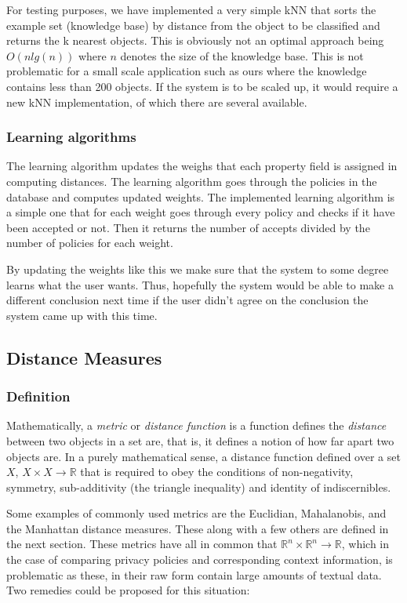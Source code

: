 For testing purposes, we have implemented a very simple kNN that sorts the example set (knowledge base) by distance from the object to be classified and returns the k nearest objects. This is obviously not an optimal approach being $O(n lg(n))$ where $n$ denotes the size of the knowledge base. This is not problematic for a small scale application such as ours where the knowledge contains less than 200 objects. If the system is to be scaled up, it would require a new kNN implementation, of which there are several available.

\subsubsection{Learning algorithms}
The learning algorithm updates the weighs that each property field is assigned in computing distances. The learning algorithm goes through the policies in the database and computes updated weights. The implemented learning algorithm is a simple one that for each weight goes through every policy and checks if it have been accepted or not. Then it returns the number of accepts divided by the number of policies for each weight.

By updating the weights like this we make sure that the system to some degree learns what the user wants. Thus, hopefully the system would be able to make a different conclusion next time if the user didn't agree on the conclusion the system came up with this time.

\subsection{Distance Measures}\label{SimilarityMeasures}

\subsubsection{Definition}

Mathematically, a \emph{metric} or \emph{distance function} is a function defines the \emph{distance} between two objects in a set are, that is, it defines a notion of how far apart two objects are. In a purely mathematical sense, a distance function defined over a set $X$, $X\times X\longrightarrow \mathbb{R}$ that is required to obey the conditions of non-negativity, symmetry, sub-additivity (the triangle inequality) and identity of indiscernibles. 

Some examples of commonly used metrics are the Euclidian, Mahalanobis, and the Manhattan distance measures. These along with a few others are defined in the next section. These metrics have all in common that $\mathbb{R}^n\times \mathbb{R}^n\longrightarrow \mathbb{R}$, which in the case of comparing privacy policies and corresponding context information, is problematic as these, in their raw form contain large amounts of textual data. Two remedies could be proposed for this situation:

